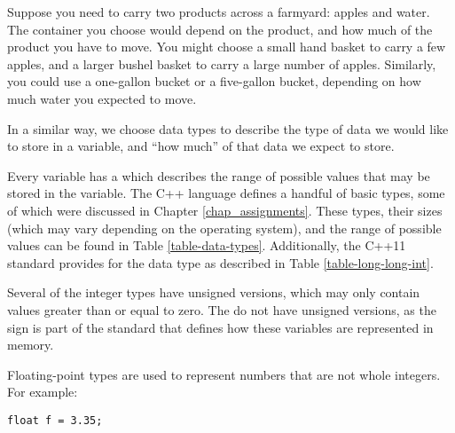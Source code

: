 
Suppose you need to carry two products across a farmyard: apples and water. 
The container you choose would depend on the product, and how much of the product you have to move. 
You might choose a small hand basket to carry a few apples, and a larger bushel basket to carry a large number of apples. 
Similarly, you could use a one-gallon bucket or a five-gallon bucket, depending on how much water you expected to move. 

In a similar way, we choose data types to describe the type of data we would like to store in a variable, and ``how much'' of that data we expect to store.

Every variable has a  which describes the range of possible values that may be stored in the variable. 
The C++ language defines a handful of basic types, some of which were discussed in Chapter \ref{chap_assignments}. 
These types, their sizes (which may vary depending on the operating system), and the range of possible values can be found in Table \ref{table-data-types}.
Additionally, the C++11 standard provides for the  data type as described in Table \ref{table-long-long-int}.

Several of the integer types have unsigned versions, which may only contain values greater than or equal to zero. 
The  do not have unsigned versions, as the sign is part of the standard that defines how these variables are represented in memory. 

Floating-point types are used to represent numbers that are not whole integers. 
For example: \nopagebreak[4]

\noindent\begin{minipage}{\linewidth}\begin{lstlisting}
float f = 3.35;
\end{lstlisting}\end{minipage}


